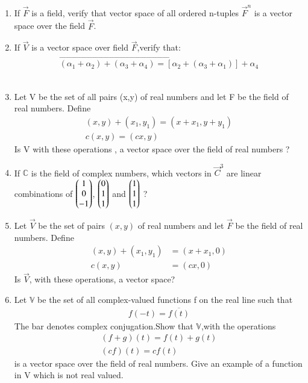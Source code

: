 \renewcommand{\theequation}{\theenumi}
\renewcommand{\thefigure}{\theenumi}
\begin{enumerate}[label=\thesubsection.\arabic*.,ref=\thesubsection.\theenumi]

\item If $\vec{F}$ is a field, verify that vector space of all ordered n-tuples $\vec{F}^n$ is a 
vector space over the field $\vec{F}$.
%
\\
\solution

\item If $\vec{V}$ is a vector space over field $\vec{F}$,verify that: \begin{align}
\vec{(\alpha_1+\alpha_2)+(\alpha_3+\alpha_4)=[\alpha_2+(\alpha_3+\alpha_1)]+\alpha_4 }
\end{align}
%
\\
\solution

%
\item Let V be the set of all pairs (x,y) of real numbers and let F be the field of real numbers. Define 
\begin{align}
(x,y)+(x_1,y_1)=(x+x_1,y+y_1)\\
c(x,y)=(cx,y)
\end{align}
Is V with these operations , a vector space over the field of real numbers ?
%
\\
\solution

%
\item If $\mathbb{C}$ is the field of complex numbers, which vectors in $\vec{C}^{3}$ are linear combinations of $\begin{pmatrix}1\\0\\-1\end{pmatrix}$, $\begin{pmatrix}0\\1\\1\end{pmatrix}$ and $\begin{pmatrix}1\\1\\1\end{pmatrix}$ ?
%
\\
\solution

\item Let $\vec{V}$ be the  set of pairs $(x,y)$ of real numbers and let $\vec{F}$ be the field of real numbers. Define
\begin{align}
    (x,y)+(x_1,y_1) &= (x+x_1,0) \label{eq:solutions/2/1/7/eq:eq1}\\
    c(x,y) &= (cx,0)
\end{align}
Is $\vec{V}$, with these operations, a vector space?
\\
\solution

%
\item    Let $\mathbb{V}$ be the set of all complex-valued functions f on the real line such that
   \begin{align}f(-t)=\overline{f(t)}\end{align}The bar denotes complex conjugation.Show that $\mathbb{V}$,with the operations\begin{align}(f+g)(t)=f(t)+g(t)\\(cf)(t)=cf(t)\end{align} is a vector space over the field of real numbers. Give an example of a function in V which is not real valued.
\\
\solution

%
\end{enumerate}


